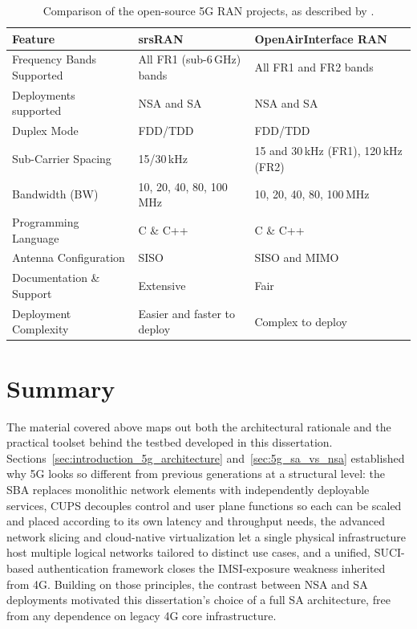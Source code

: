 \begin{table}[htbp]
\centering
\footnotesize
\renewcommand{\arraystretch}{1.5}
\begin{tabularx}{\textwidth}{|l|X|X|}
\hline
\rowcolor{gray!30}
\textbf{Feature} & \textbf{srsRAN} & \textbf{OpenAirInterface \gls{RAN}} \\ \hline
Frequency Bands Supported & All FR1 (sub-6\,GHz) bands & All FR1 and FR2 bands \\ \hline
Deployments supported & \gls{NSA} and \gls{SA} & \gls{NSA} and \gls{SA} \\ \hline
Duplex Mode & \gls{FDD}/\gls{TDD} & \gls{FDD}/\gls{TDD} \\ \hline
Sub-Carrier Spacing & 15/30\,kHz & 15 and 30\,kHz (FR1), 120\,kHz (FR2) \\ \hline
Bandwidth (BW) & 10, 20, 40, 80, 100\,MHz & 10, 20, 40, 80, 100\,MHz \\ \hline
Programming Language & C \& C++ & C \& C++ \\ \hline
Antenna Configuration & SISO & SISO and \gls{MIMO} \\ \hline
Documentation \& Support & Extensive & Fair \\ \hline
Deployment Complexity & Easier and faster to deploy & Complex to deploy \\ \hline
\end{tabularx}
\caption[Comparison of the open-source 5G RAN projects.]{Comparison of the open-source 5G RAN projects, as described by \textcite{mamushiane2023deploying}.}
\label{tab:5gran_implementations}
\end{table}

\section{Summary}
\label{sec:5g_fundamentals_summary}

The material covered above maps out both the architectural rationale and the practical toolset behind the testbed developed in this dissertation. Sections~\ref{sec:introduction_5g_architecture} and~\ref{sec:5g_sa_vs_nsa} established why 5G looks so different from previous generations at a structural level: the \gls{SBA} replaces monolithic network elements with independently deployable services, \gls{CUPS} decouples control and user plane functions so each can be scaled and placed according to its own latency and throughput needs, the advanced network slicing and cloud-native virtualization let a single physical infrastructure host multiple logical networks tailored to distinct use cases, and a unified, \gls{SUCI}-based authentication framework closes the \gls{IMSI}-exposure weakness inherited from 4G. Building on those principles, the contrast between \gls{NSA} and \gls{SA} deployments motivated this dissertation's choice of a full \gls{SA} architecture, free from any dependence on legacy 4G core infrastructure.

